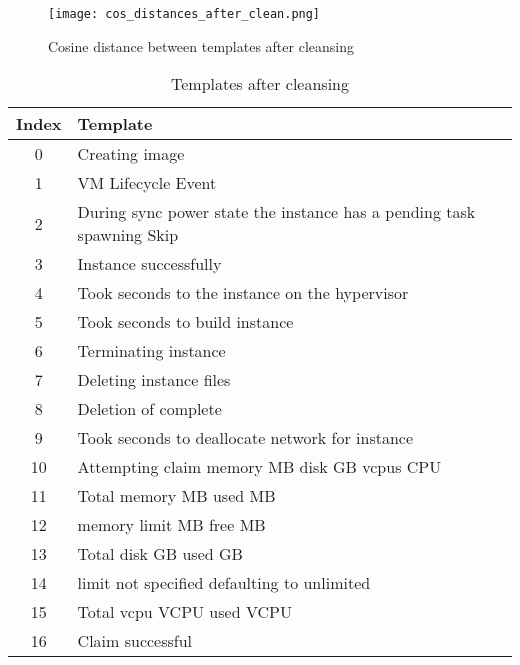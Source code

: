 \begin{figure}[h]
  \centering
  \texttt{[image: cos\_distances\_after\_clean.png]}\\
  \caption{Cosine distance between templates after cleansing}
  \label{fig:cos_distance_after_cleansing}
\end{figure}

\begin{table}[ht]
\begin{small}
\begin{tabular}{ c l } 
\toprule
Index & Template \\
\midrule
0 & Creating image\\
1 & VM  Lifecycle Event\\
2 & During sync power state the instance has a pending task spawning Skip\\
3 & Instance  successfully\\
4 & Took  seconds to  the instance on the hypervisor\\
5 & Took  seconds to build instance\\
6 & Terminating instance\\
7 & Deleting instance files\\
8 & Deletion of complete\\
9 & Took  seconds to deallocate network for instance\\
10 & Attempting claim memory  MB disk  GB vcpus  CPU\\
11 & Total memory  MB used  MB\\
12 & memory limit  MB free  MB\\
13 & Total disk  GB used  GB\\
14 & limit not specified defaulting to unlimited\\
15 & Total vcpu  VCPU used  VCPU\\
16 & Claim successful\\
\bottomrule
\end{tabular}
\caption{Templates after cleansing}
\label{tab:templates_after_cleansing}
\end{small}
\end{table}

